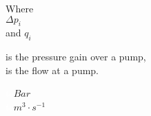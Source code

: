 \begin{minipage}[t]{0.20\textwidth}

Where\\
\hspace*{8mm} $\Delta{p}_i$ \\
and \hspace*{0.7mm} $q_i$	
\end{minipage}
\begin{minipage}[t]{0.68\textwidth}
\vspace*{2mm}
is the pressure gain over a pump,\\
is the flow at a pump.
\end{minipage}
\begin{minipage}[t]{0.10\textwidth}
\vspace*{2mm}
\textcolor{White}{te}$\unit{Bar}$\\
\textcolor{White}{te}$\unit{m^3 \cdot s^{-1}}$
\end{minipage}